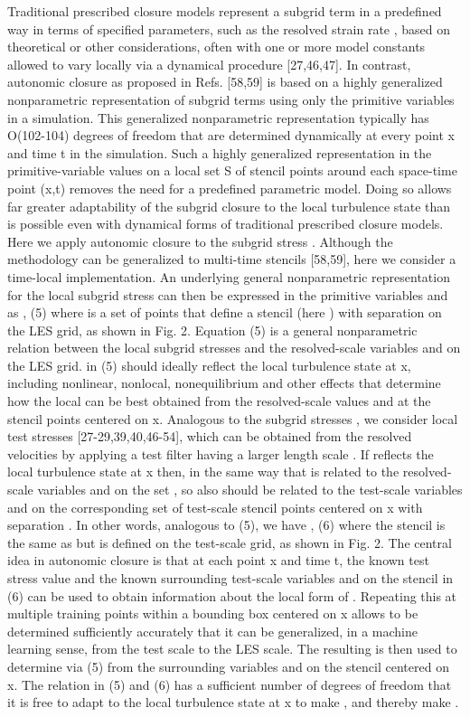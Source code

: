  Traditional prescribed closure models represent a subgrid term in a predefined way in terms of specified parameters, such as the resolved strain rate  , based on theoretical or other considerations, often with one or more model constants allowed to vary locally via a dynamical procedure [27,46,47]. In contrast, autonomic closure as proposed in Refs. [58,59] is based on a highly generalized nonparametric representation of subgrid terms using only the primitive variables in a simulation. This generalized nonparametric representation typically has O(102-104) degrees of freedom that are determined dynamically at every point x and time t in the simulation. Such a highly generalized representation in the primitive-variable values on a local set S of stencil points around each space-time point (x,t) removes the need for a predefined parametric model. Doing so allows far greater adaptability of the subgrid closure to the local turbulence state than is possible even with dynamical forms of traditional prescribed closure models. 
Here we apply autonomic closure to the subgrid stress  . Although the methodology can be generalized to multi-time stencils [58,59], here we consider a time-local implementation. An underlying general nonparametric representation   for the local subgrid stress   can then be expressed in the primitive variables   and   as
   ,                                (5)
where   is a set of points   that define a stencil (here  ) with separation   on the LES grid, as shown in Fig. 2. Equation (5) is a general nonparametric relation between the local subgrid stresses   and the resolved-scale variables   and   on the LES grid.   in (5) should ideally reflect the local turbulence state at x, including nonlinear, nonlocal, nonequilibrium and other effects that determine how the local   can be best obtained from the resolved-scale values   and   at the stencil points   centered on x. 
Analogous to the subgrid stresses  , we consider local test stresses   
[27-29,39,40,46-54], which can be obtained from the resolved velocities   by applying a test filter   having a larger length scale  . If   reflects the local turbulence state at x then, in the same way that   is related to the resolved-scale variables   and   on the set  , so also should   be related to the test-scale variables   and   on the corresponding set   of test-scale stencil points centered on x with separation  . In other words, analogous to (5), we have
   ,                              (6)
where the stencil   is the same as   but is defined on the test-scale grid, as shown in Fig. 2. 
The central idea in autonomic closure is that at each point x and time t, the known test stress value   and the known surrounding test-scale variables   and   on the stencil   in (6) can be used to obtain information about the local form of  . Repeating this at multiple training points within a bounding box centered on x allows   to be determined sufficiently accurately that it can be generalized, in a machine learning sense, from the test scale to the LES scale. The resulting   is then used to determine   via (5) from the surrounding variables   and   on the stencil   centered on x. The relation   in (5) and (6) has a sufficient number of degrees of freedom that it is free to adapt to the local turbulence state at x to make  , and thereby make  .
